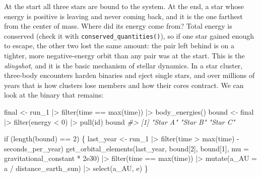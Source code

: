 \documentclass[
  10.5pt,
  letterpaper,
]{scrbook}
\newenvironment{Shaded}{\begin{snugshade}}{\end{snugshade}}
\newcommand{\AttributeTok}[1]{\textcolor[rgb]{0.00,0.00,0.00}{#1}}
\newcommand{\CommentTok}[1]{\textcolor[rgb]{0.00,0.00,0.00}{\textit{#1}}}
\newcommand{\ControlFlowTok}[1]{\textcolor[rgb]{0.00,0.00,0.00}{#1}}
\newcommand{\DecValTok}[1]{\textcolor[rgb]{0.00,0.00,0.00}{#1}}
\newcommand{\FloatTok}[1]{\textcolor[rgb]{0.00,0.00,0.00}{#1}}
\newcommand{\FunctionTok}[1]{\textcolor[rgb]{0.00,0.00,0.00}{#1}}
\newcommand{\NormalTok}[1]{\textcolor[rgb]{0.00,0.00,0.00}{#1}}
\newcommand{\OtherTok}[1]{\textcolor[rgb]{0.00,0.00,0.00}{#1}}
\newcommand{\SpecialCharTok}[1]{\textcolor[rgb]{0.00,0.00,0.00}{#1}}
\theoremstyle{plain}
\theoremstyle{remark}
\begin{document}
At the start all three stars are bound to the system. At the end, a star
whose energy is positive is leaving and never coming back, and it is the
one farthest from the center of mass. Where did its energy come from?
Total energy is conserved (check it with
\texttt{conserved\_quantities()}), so if one star gained enough to
escape, the other two lost the same amount: the pair left behind is on a
tighter, more negative-energy orbit than any pair was at the start. This
is the \emph{slingshot}, and it is the basic mechanism of stellar
dynamics. In a star cluster, three-body encounters harden binaries and
eject single stars, and over millions of years that is how clusters lose
members and how their cores contract. We can look at the binary that
remains:

\begin{Shaded}
\begin{Highlighting}[]
\NormalTok{final }\OtherTok{\textless{}{-}}\NormalTok{ run\_1 }\SpecialCharTok{|\textgreater{}} \FunctionTok{filter}\NormalTok{(time }\SpecialCharTok{==} \FunctionTok{max}\NormalTok{(time)) }\SpecialCharTok{|\textgreater{}} \FunctionTok{body\_energies}\NormalTok{()}
\NormalTok{bound }\OtherTok{\textless{}{-}}\NormalTok{ final }\SpecialCharTok{|\textgreater{}} \FunctionTok{filter}\NormalTok{(energy }\SpecialCharTok{\textless{}} \DecValTok{0}\NormalTok{) }\SpecialCharTok{|\textgreater{}} \FunctionTok{pull}\NormalTok{(id)}
\NormalTok{bound}
\CommentTok{\#\textgreater{} [1] "Star A" "Star B" "Star C"}
\end{Highlighting}
\end{Shaded}

\begin{Shaded}
\begin{Highlighting}[]
\ControlFlowTok{if}\NormalTok{ (}\FunctionTok{length}\NormalTok{(bound) }\SpecialCharTok{==} \DecValTok{2}\NormalTok{) \{}
\NormalTok{  last\_year }\OtherTok{\textless{}{-}}\NormalTok{ run\_1 }\SpecialCharTok{|\textgreater{}} \FunctionTok{filter}\NormalTok{(time }\SpecialCharTok{\textgreater{}} \FunctionTok{max}\NormalTok{(time) }\SpecialCharTok{{-}}\NormalTok{ seconds\_per\_year)}
  \FunctionTok{get\_orbital\_elements}\NormalTok{(last\_year, bound[}\DecValTok{2}\NormalTok{], bound[}\DecValTok{1}\NormalTok{],}
                       \AttributeTok{mu =}\NormalTok{ gravitational\_constant }\SpecialCharTok{*} \FloatTok{2e30}\NormalTok{) }\SpecialCharTok{|\textgreater{}}
    \FunctionTok{filter}\NormalTok{(time }\SpecialCharTok{==} \FunctionTok{max}\NormalTok{(time)) }\SpecialCharTok{|\textgreater{}}
    \FunctionTok{mutate}\NormalTok{(}\AttributeTok{a\_AU =}\NormalTok{ a }\SpecialCharTok{/}\NormalTok{ distance\_earth\_sun) }\SpecialCharTok{|\textgreater{}}
    \FunctionTok{select}\NormalTok{(a\_AU, e)}
\NormalTok{\}}
\end{Highlighting}
\end{Shaded}
\end{document}
